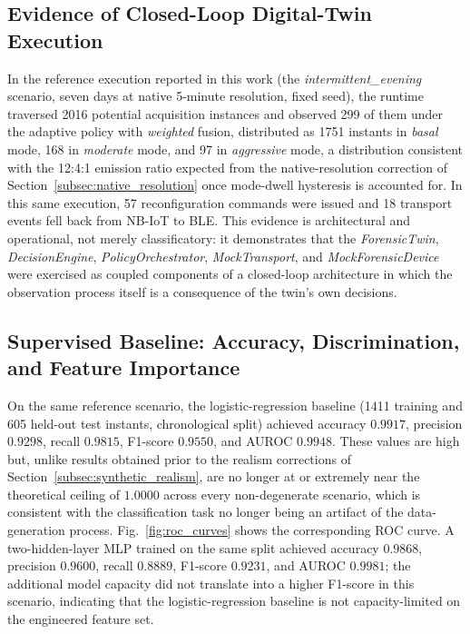 \documentclass{ieeeaccess}
\begin{document}
\subsection{Evidence of Closed-Loop Digital-Twin Execution}
In the reference execution reported in this work (the \textit{intermittent\_evening} scenario, seven days at native 5-minute resolution, fixed seed), the runtime traversed 2016 potential acquisition instances and observed 299 of them under the adaptive policy with \textit{weighted} fusion, distributed as 1751 instants in \textit{basal} mode, 168 in \textit{moderate} mode, and 97 in \textit{aggressive} mode, a distribution consistent with the 12:4:1 emission ratio expected from the native-resolution correction of Section~\ref{subsec:native_resolution} once mode-dwell hysteresis is accounted for. In this same execution, 57 reconfiguration commands were issued and 18 transport events fell back from NB-IoT to BLE. This evidence is architectural and operational, not merely classificatory: it demonstrates that the \textit{ForensicTwin}, \textit{DecisionEngine}, \textit{PolicyOrchestrator}, \textit{MockTransport}, and \textit{MockForensicDevice} were exercised as coupled components of a closed-loop architecture in which the observation process itself is a consequence of the twin's own decisions.

\subsection{Supervised Baseline: Accuracy, Discrimination, and Feature Importance}
On the same reference scenario, the logistic-regression baseline (1411 training and 605 held-out test instants, chronological split) achieved accuracy $0.9917$, precision $0.9298$, recall $0.9815$, F1-score $0.9550$, and AUROC $0.9948$. These values are high but, unlike results obtained prior to the realism corrections of Section~\ref{subsec:synthetic_realism}, are no longer at or extremely near the theoretical ceiling of $1.0000$ across every non-degenerate scenario, which is consistent with the classification task no longer being an artifact of the data-generation process. Fig.~\ref{fig:roc_curves} shows the corresponding ROC curve. A two-hidden-layer MLP trained on the same split achieved accuracy $0.9868$, precision $0.9600$, recall $0.8889$, F1-score $0.9231$, and AUROC $0.9981$; the additional model capacity did not translate into a higher F1-score in this scenario, indicating that the logistic-regression baseline is not capacity-limited on the engineered feature set.
\end{document}
